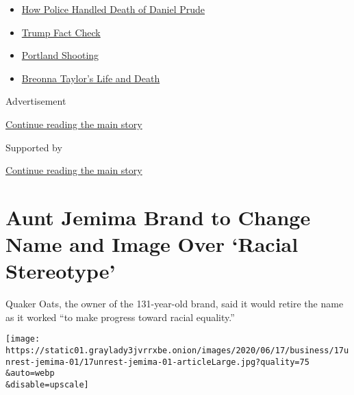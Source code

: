 \begin{itemize}
\tightlist
\item
  \href{https://www.nytimes3xbfgragh.onion/2020/09/04/nyregion/rochester-police-daniel-prude.html?name=styln-george-floyd\&region=TOP_BANNER\&block=storyline_menu_recirc\&action=click\&pgtype=Article\&impression_id=bcc8f9f0-f1d4-11ea-9a4f-2bebfff0e82c\&variant=undefined}{How
  Police Handled Death of Daniel Prude}
\item
  \href{https://www.nytimes3xbfgragh.onion/2020/09/01/us/politics/trump-fact-check-protests.html?name=styln-george-floyd\&region=TOP_BANNER\&block=storyline_menu_recirc\&action=click\&pgtype=Article\&impression_id=bcc8f9f1-f1d4-11ea-9a4f-2bebfff0e82c\&variant=undefined}{Trump
  Fact Check}
\item
  \href{https://www.nytimes3xbfgragh.onion/2020/08/30/us/portland-shooting-explained.html?name=styln-george-floyd\&region=TOP_BANNER\&block=storyline_menu_recirc\&action=click\&pgtype=Article\&impression_id=bcc8f9f2-f1d4-11ea-9a4f-2bebfff0e82c\&variant=undefined}{Portland
  Shooting}
\item
  \href{https://www.nytimes3xbfgragh.onion/2020/08/30/us/breonna-taylor-police-killing.html?name=styln-george-floyd\&region=TOP_BANNER\&block=storyline_menu_recirc\&action=click\&pgtype=Article\&impression_id=bcc8f9f3-f1d4-11ea-9a4f-2bebfff0e82c\&variant=undefined}{Breonna
  Taylor's Life and Death}
\end{itemize}

Advertisement

\protect\hyperlink{after-top}{Continue reading the main story}

Supported by

\protect\hyperlink{after-sponsor}{Continue reading the main story}

\hypertarget{aunt-jemima-brand-to-change-name-and-image-over-racial-stereotype}{%
\section{Aunt Jemima Brand to Change Name and Image Over `Racial
Stereotype'}\label{aunt-jemima-brand-to-change-name-and-image-over-racial-stereotype}}

Quaker Oats, the owner of the 131-year-old brand, said it would retire
the name as it worked ``to make progress toward racial equality.''

\texttt{[image: https://static01.graylady3jvrrxbe.onion/images/2020/06/17/business/17unrest-jemima-01/17unrest-jemima-01-articleLarge.jpg?quality=75\\\&auto=webp\\\&disable=upscale]}


